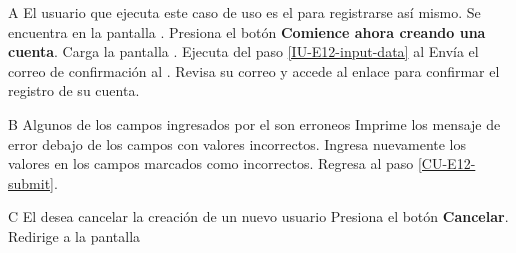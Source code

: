 \begin{UCtrayectoriaA}{A}{%
El usuario que ejecuta este caso de uso es el  para registrarse
así mismo.
}
  \Actor Se encuentra en la pantalla . 
  \Actor Presiona el botón {\bf Comience ahora creando una cuenta}.
  \Sistema Carga la pantalla .
  \Sistema Ejecuta del paso \ref{IU-E12-input-data} al 
  \Sistema Envía el correo de confirmación al . 
  \Actor Revisa su correo y accede al enlace para confirmar el registro de su cuenta.
\end{UCtrayectoriaA}

\begin{UCtrayectoriaA}{B}{%
Algunos de los campos ingresados por el  son erroneos
}
  \Sistema Imprime los mensaje de error debajo de los campos con valores incorrectos.
  \Actor Ingresa nuevamente los valores en los campos marcados como incorrectos.
  \Sistema Regresa al paso \ref{CU-E12-submit}.
\end{UCtrayectoriaA}


\begin{UCtrayectoriaA}{C}{%
El  desea cancelar la creación de un nuevo usuario
}
  \Actor Presiona el botón {\bf Cancelar}.
  \Sistema Redirige a la pantalla 
\end{UCtrayectoriaA}
